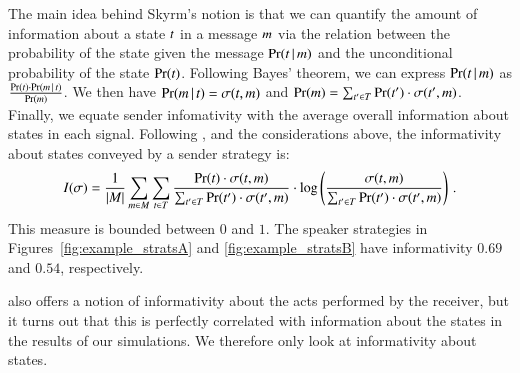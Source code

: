The main idea behind Skyrm's notion is that we can quantify the amount
of information about a state $t$ in a message $m$ via the
relation between the probability of the state given the message
$\Pr(t \,|\, m)$ and the unconditional probability of the
state $\Pr(t)$.  Following Bayes' theorem, we can express
$\Pr(t \,|\, m)$ as $\frac{\Pr(t) \cdot \Pr(m
  \,|\, t)}{\Pr(m)}$.  We then have $\Pr(m \,|\,
t) = \sigma(t,m)$ and $\Pr(m) =
\sum_{t^\prime \in T} \Pr(t^\prime) \cdot
\sigma(t^\prime,m)$.  Finally, we equate sender
infomativity with the average overall information about states in each
signal.  Following \citet[p.~36]{Skyrms2010:Signals}, and the
considerations above, the informativity about states conveyed by a
sender strategy is:
\begin{align*}
  I(\sigma) = \frac{1}{|M|} \sum_{m \in M}
  \sum_{t \in T} \frac{\Pr(t) \cdot
    \sigma(t,m)}{\sum_{t^\prime \in T}
    \Pr(t^\prime) \cdot \sigma(t^\prime,m)} \cdot \log
  \left(\frac{\sigma(t,m)}{\sum_{t^\prime \in T}
      \Pr(t^\prime) \cdot \sigma(t^\prime,m)} \right)
  \,. 
\end{align*}
This measure is bounded between $0$ and $1$. The speaker strategies in
Figures~\ref{fig:example_stratsA} and \ref{fig:example_stratsB} have
informativity $0.69$ and $0.54$, respectively.

\citet[p.~39]{Skyrms2010:Signals} also offers a notion of
informativity about the acts performed by the receiver, but it turns
out that this is perfectly correlated with information about the
states in the results of our simulations. We therefore only look at
informativity about states. 






